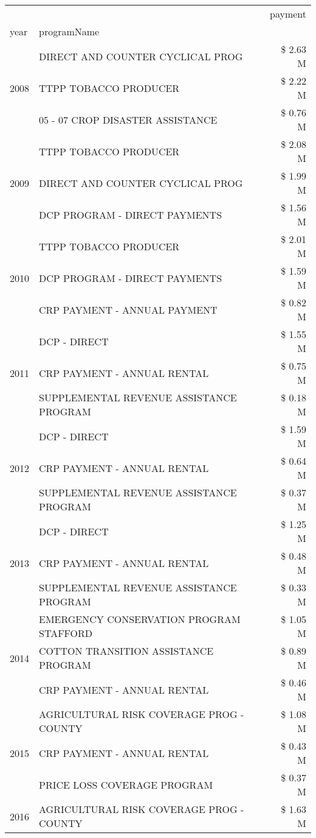 \begin{tabular}{llr}
\toprule
 &  & payment \\
year & programName &  \\
\midrule
\multirow[t]{3}{*}{2008} & DIRECT AND COUNTER CYCLICAL PROG & \$ 2.63 M \\
 & TTPP TOBACCO PRODUCER & \$ 2.22 M \\
 & 05 - 07 CROP DISASTER ASSISTANCE & \$ 0.76 M \\
\cline{1-3}
\multirow[t]{3}{*}{2009} & TTPP TOBACCO PRODUCER & \$ 2.08 M \\
 & DIRECT AND COUNTER CYCLICAL PROG & \$ 1.99 M \\
 & DCP PROGRAM - DIRECT PAYMENTS & \$ 1.56 M \\
\cline{1-3}
\multirow[t]{3}{*}{2010} & TTPP TOBACCO PRODUCER & \$ 2.01 M \\
 & DCP PROGRAM - DIRECT PAYMENTS & \$ 1.59 M \\
 & CRP PAYMENT - ANNUAL PAYMENT & \$ 0.82 M \\
\cline{1-3}
\multirow[t]{3}{*}{2011} & DCP - DIRECT & \$ 1.55 M \\
 & CRP PAYMENT - ANNUAL RENTAL & \$ 0.75 M \\
 & SUPPLEMENTAL REVENUE ASSISTANCE PROGRAM & \$ 0.18 M \\
\cline{1-3}
\multirow[t]{3}{*}{2012} & DCP - DIRECT & \$ 1.59 M \\
 & CRP PAYMENT - ANNUAL RENTAL & \$ 0.64 M \\
 & SUPPLEMENTAL REVENUE ASSISTANCE PROGRAM & \$ 0.37 M \\
\cline{1-3}
\multirow[t]{3}{*}{2013} & DCP - DIRECT & \$ 1.25 M \\
 & CRP PAYMENT - ANNUAL RENTAL & \$ 0.48 M \\
 & SUPPLEMENTAL REVENUE ASSISTANCE PROGRAM & \$ 0.33 M \\
\cline{1-3}
\multirow[t]{3}{*}{2014} & EMERGENCY CONSERVATION PROGRAM STAFFORD & \$ 1.05 M \\
 & COTTON TRANSITION ASSISTANCE PROGRAM & \$ 0.89 M \\
 & CRP PAYMENT - ANNUAL RENTAL & \$ 0.46 M \\
\cline{1-3}
\multirow[t]{3}{*}{2015} & AGRICULTURAL RISK COVERAGE PROG - COUNTY & \$ 1.08 M \\
 & CRP PAYMENT - ANNUAL RENTAL & \$ 0.43 M \\
 & PRICE LOSS COVERAGE PROGRAM & \$ 0.37 M \\
\cline{1-3}
\multirow[t]{3}{*}{2016} & AGRICULTURAL RISK COVERAGE PROG - COUNTY & \$ 1.63 M \\

\end{tabular}

